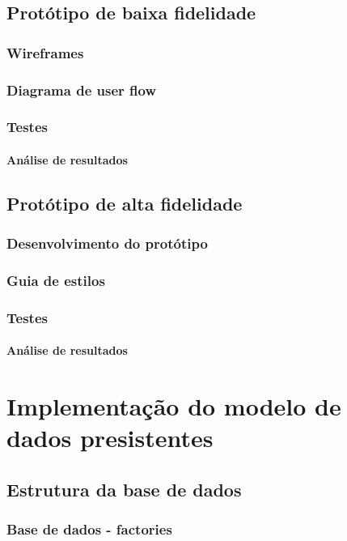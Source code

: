 \documentclass[11pt, twoside]{report}
\begin{document}
	\section{Protótipo de baixa fidelidade}
	\subsection{Wireframes}
	\subsection{Diagrama de user flow}
	\subsection{Testes}
	\subsubsection{Análise de resultados}
	
	\section{Protótipo de alta fidelidade}
	\subsection{Desenvolvimento do protótipo}
	\subsection{Guia de estilos}
	\subsection{Testes}
	\subsubsection{Análise de resultados}
	
	\chapter{Implementação do modelo de dados presistentes}
	\section{Estrutura da base de dados}
	\subsection{Base de dados - factories}
\end{document}
